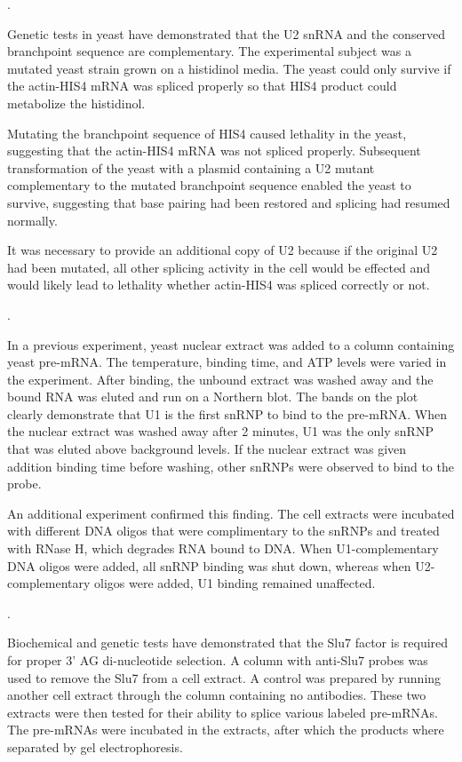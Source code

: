 \documentclass[a4paper, 10pt]{article}
\newcounter{prob_num}
\newcommand{\problem}{\vspace{20pt}\arabic{prob_num}.\stepcounter{prob_num}\par}
\begin{document}
\problem

Genetic tests in yeast have demonstrated that the U2 snRNA and the conserved branchpoint sequence are complementary. The experimental subject was a mutated yeast strain grown on a histidinol media. The yeast could only survive if the actin-HIS4 mRNA was spliced properly so that HIS4 product could metabolize the histidinol.

Mutating the branchpoint sequence of HIS4 caused lethality in the yeast, suggesting that the actin-HIS4 mRNA was not spliced properly. Subsequent transformation of the yeast with a plasmid containing a U2 mutant complementary to the mutated branchpoint sequence enabled the yeast to survive, suggesting that base pairing had been restored and splicing had resumed normally.

It was necessary to provide an additional copy of U2 because if the original U2 had been mutated, all other splicing activity in the cell would be effected and would likely lead to lethality whether actin-HIS4 was spliced correctly or not.


\problem

In a previous experiment, yeast nuclear extract was added to a column containing yeast pre-mRNA. The temperature, binding time, and ATP levels were varied in the experiment. After binding, the unbound extract was washed away and the bound RNA was eluted and run on a Northern blot. The bands on the plot clearly demonstrate that U1 is the first snRNP to bind to the pre-mRNA. When the nuclear extract was washed away after 2 minutes, U1 was the only snRNP that was eluted above background levels. If the nuclear extract was given addition binding time before washing, other snRNPs were observed to bind to the probe.

An additional experiment confirmed this finding. The cell extracts were incubated with different DNA oligos that were complimentary to the snRNPs and treated with RNase H, which degrades RNA bound to DNA. When U1-complementary DNA oligos were added, all snRNP binding was shut down, whereas when U2-complementary oligos were added, U1 binding remained unaffected.


\problem

Biochemical and genetic tests have demonstrated that the Slu7 factor is required for proper 3' AG di-nucleotide selection. A column with anti-Slu7 probes was used to remove the Slu7 from a cell extract. A control was prepared by running another cell extract through the column containing no antibodies. These two extracts were then tested for their ability to splice various labeled pre-mRNAs. The pre-mRNAs were incubated in the extracts, after which the products where separated by gel electrophoresis.
\end{document}
